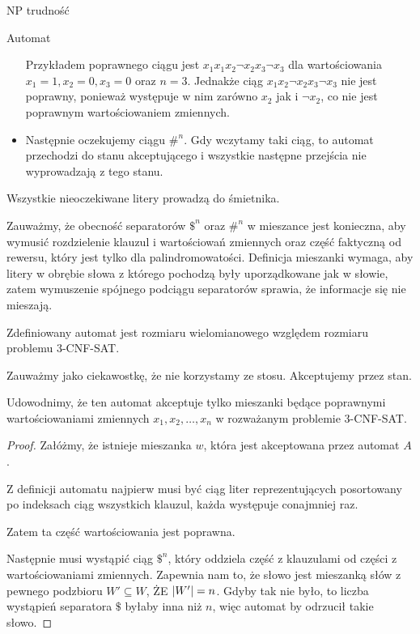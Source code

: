 \documentclass{article}
\theoremstyle{definition}
\theoremstyle{remark}
\begin{document}
\begin{section}{NP trudność}
\begin{subsection}{Automat}
\begin{itemize}
               Przykładem poprawnego ciągu jest $x_1 x_1 x_2 \neg x_2 x_3 \neg x_3$ dla
               wartościowania $x_1 = 1, x_2 = 0, x_3 = 0$ oraz $n = 3$. Jednakże ciąg $x_1 x_2
                   \neg x_2 x_3 \neg x_3$ nie jest poprawny, ponieważ występuje w nim zarówno
               $x_2$ jak i $\neg x_2$, co nie jest poprawnym wartościowaniem zmiennych.

         \item Następnie oczekujemy ciągu $ \#^n$. Gdy wczytamy taki ciąg, to automat
               przechodzi do stanu akceptującego i wszystkie następne przejścia nie
               wyprowadzają z tego stanu.

     \end{itemize}

     Wszystkie nieoczekiwane litery prowadzą do śmietnika.

     Zauważmy, że obecność separatorów $ \$^n $ oraz $ \#^n $ w mieszance jest
     konieczna, aby wymusić rozdzielenie klauzul i wartościowań zmiennych oraz część
     faktyczną od rewersu, który jest tylko dla palindromowatości. Definicja
     mieszanki wymaga, aby litery w obrębie słowa z którego pochodzą były
     uporządkowane jak w słowie, zatem wymuszenie spójnego podciągu separatorów
     sprawia, że informacje się nie mieszają.

     Zdefiniowany automat jest rozmiaru wielomianowego względem rozmiaru problemu
     3-CNF-SAT.

     Zauważmy jako ciekawostkę, że nie korzystamy ze stosu. Akceptujemy przez stan.

     Udowodnimy, że ten automat akceptuje tylko mieszanki będące poprawnymi
     wartościowaniami zmiennych $x_1, x_2, \ldots, x_n$ w rozważanym problemie
     3-CNF-SAT.

     \begin{proof}
         Załóżmy, że istnieje mieszanka $w$, która jest akceptowana przez automat
         $A$.

         Z definicji automatu najpierw musi być ciąg liter reprezentujących posortowany
         po indeksach ciąg wszystkich klauzul, każda występuje conajmniej raz.

         Zatem ta część wartościowania jest poprawna.

         Następnie musi wystąpić ciąg $ \$^n $, który oddziela część z klauzulami od
         części z wartościowaniami zmiennych. Zapewnia nam to, że słowo jest mieszanką
         słów z pewnego podzbioru $W' \subseteq W$, ŻE $ \abs{W'} = n $. Gdyby tak nie
         było, to liczba wystąpień separatora $ \$ $ byłaby inna niż $n$, więc automat
         by odrzucił takie słowo.


\end{proof}
\end{subsection}
\end{section}
\end{document}
